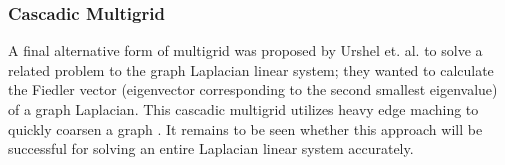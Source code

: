 \documentclass{article}
\begin{document}
\subsubsection{Cascadic Multigrid}
A final alternative form of multigrid was proposed by Urshel et. al. to solve a related problem to the graph Laplacian linear system; they wanted to calculate the Fiedler vector (eigenvector corresponding to the second smallest eigenvalue) of a graph Laplacian. This cascadic multigrid utilizes heavy edge maching to quickly coarsen a graph \cite{Urschel:2014}. It remains to be seen whether this approach will be successful for solving an entire Laplacian linear system accurately.


%
%
\end{document}
